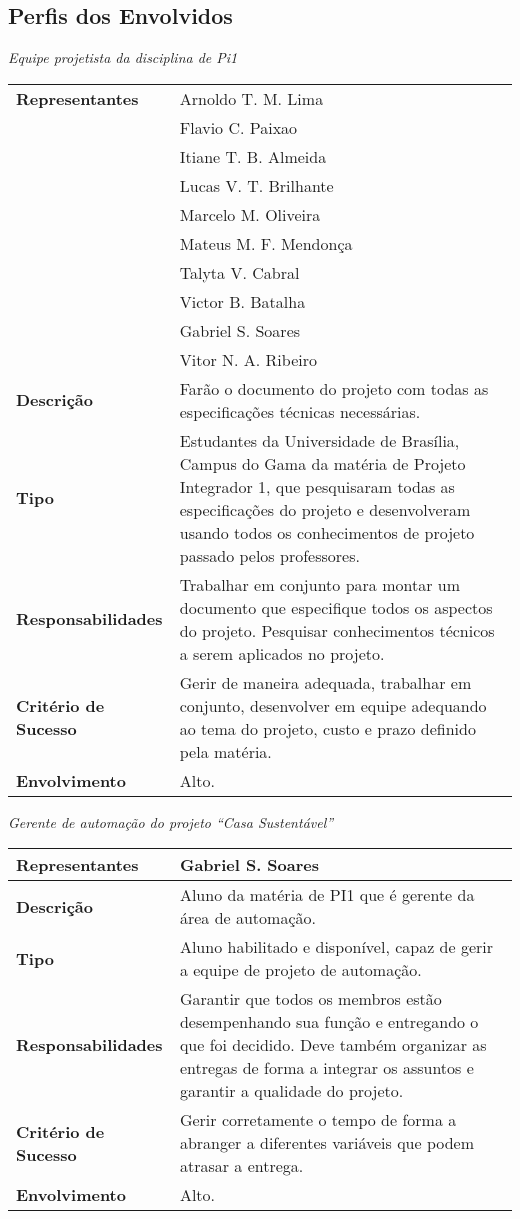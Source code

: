\subsection{Perfis dos Envolvidos}

\textit{Equipe projetista da disciplina de Pi1}

\begin{longtable}{|m{5cm}|m{10cm}|}
	\hline \textbf{Representantes} & Arnoldo T. M. Lima\\ & Flavio C. Paixao\\ & Itiane T. B. Almeida\\ & Lucas V. T. Brilhante\\ & Marcelo M. Oliveira\\ & Mateus M. F. Mendon\c{c}a\\ & Talyta V. Cabral\\ & Victor B. Batalha\\ & Gabriel S. Soares\\ & Vitor N. A. Ribeiro\\
	\hline \textbf{Descrição} & Farão o documento do projeto com todas as especificações técnicas necessárias.\\
	\hline \textbf{Tipo} & Estudantes da Universidade de Brasília, Campus do Gama da matéria de Projeto Integrador 1, que pesquisaram todas as especificações do projeto e desenvolveram usando todos os conhecimentos de projeto passado pelos professores.\\
	\hline \textbf{Responsabilidades} & Trabalhar em conjunto para montar um documento que especifique todos os aspectos do projeto. Pesquisar conhecimentos técnicos a serem aplicados no projeto.\\
	\hline \textbf{Critério de Sucesso} & Gerir de maneira adequada, trabalhar em conjunto, desenvolver em equipe adequando ao tema do projeto, custo e prazo definido pela matéria.\\
	\hline \textbf{Envolvimento} & Alto.\\
	\hline
\end{longtable}

\textit{Gerente de automação do projeto “Casa Sustentável”}

\begin{longtable}{|m{5cm}|m{10cm}|}
	\hline \textbf{Representantes} & Gabriel S. Soares\\
	\hline \textbf{Descrição} & Aluno da matéria de PI1 que é gerente da área de automação.\\
	\hline \textbf{Tipo} & Aluno habilitado e disponível, capaz de gerir a equipe de projeto de automação.\\
	\hline \textbf{Responsabilidades} & Garantir que todos os membros estão desempenhando sua função e entregando o que foi decidido. Deve também organizar as entregas de forma a integrar os assuntos e garantir a qualidade do projeto.\\
	\hline \textbf{Critério de Sucesso} & Gerir corretamente o tempo de forma a abranger a diferentes variáveis que podem atrasar a entrega.\\
	\hline \textbf{Envolvimento} & Alto.\\
	\hline
\end{longtable}

